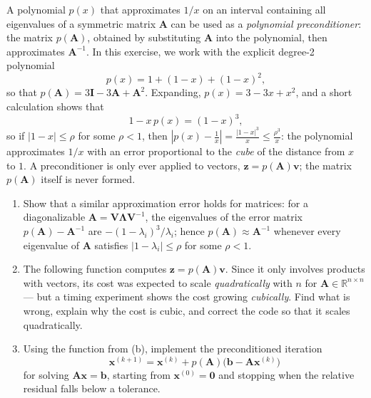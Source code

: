 \begin{exercise} %
    A polynomial $p(x)$ that approximates $1/x$ on an interval containing all eigenvalues of a symmetric matrix $\mathbf{A}$ can be used as a \emph{polynomial preconditioner}: the matrix $p(\mathbf{A})$, obtained by substituting $\mathbf{A}$ into the polynomial, then approximates $\mathbf{A}^{-1}$.
    In this exercise, we work with the explicit degree-2 polynomial
    \begin{equation*}
        p(x) = 1 + (1-x) + (1-x)^2,
    \end{equation*}
    so that $p(\mathbf{A}) = 3\mathbf{I} - 3\mathbf{A} + \mathbf{A}^2$.
    Expanding, $p(x) = 3 - 3x + x^2$, and a short calculation shows that
    \begin{equation*}
        1 - x\, p(x) = (1-x)^3,
    \end{equation*}
    so if $|1-x| \leq \rho$ for some $\rho < 1$, then $\left|p(x) - \frac{1}{x}\right| = \frac{|1-x|^3}{x} \leq \frac{\rho^3}{x}$: the polynomial approximates $1/x$ with an error proportional to the \emph{cube} of the distance from $x$ to $1$.
    A preconditioner is only ever applied to vectors, $\mathbf{z} = p(\mathbf{A})\mathbf{v}$; the matrix $p(\mathbf{A})$ itself is never formed.
    \begin{enumerate}[label=(\alph*)]
        \item Show that a similar approximation error holds for matrices: for a diagonalizable $\mathbf{A} = \mathbf{V}\boldsymbol{\Lambda}\mathbf{V}^{-1}$, the eigenvalues of the error matrix $p(\mathbf{A}) - \mathbf{A}^{-1}$ are $-(1-\lambda_i)^3/\lambda_i$; hence $p(\mathbf{A}) \approx \mathbf{A}^{-1}$ whenever every eigenvalue of $\mathbf{A}$ satisfies $|1-\lambda_i| \leq \rho$ for some $\rho < 1$.
        \item The following function computes $\mathbf{z} = p(\mathbf{A})\mathbf{v}$. Since it only involves products with vectors, its cost was expected to scale \emph{quadratically} with $n$ for $\mathbf{A} \in \mathbb{R}^{n \times n}$ --- but a timing experiment shows the cost growing \emph{cubically}. Find what is wrong, explain why the cost is cubic, and correct the code so that it scales quadratically.
        
        \item Using the function from (b), implement the preconditioned iteration
        \begin{equation*}
            \mathbf{x}^{(k+1)} = \mathbf{x}^{(k)} + p(\mathbf{A})\bigl(\mathbf{b} - \mathbf{A}\mathbf{x}^{(k)}\bigr)
        \end{equation*}
        for solving $\mathbf{A}\mathbf{x} = \mathbf{b}$, starting from $\mathbf{x}^{(0)} = \mathbf{0}$ and stopping when the relative residual falls below a tolerance.
    \end{enumerate}
\end{exercise}

